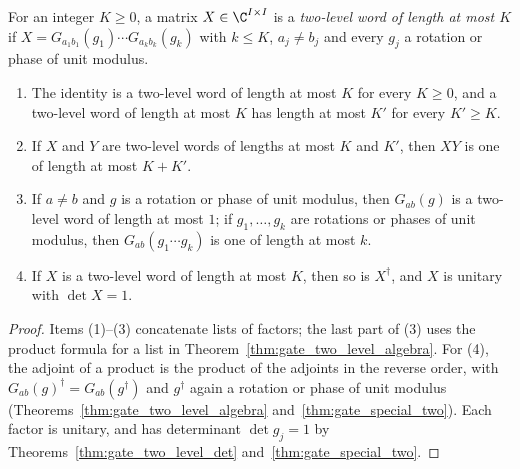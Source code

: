 \begin{definition}
    \label{def:gate_two_level_word}
    \leanok
    For an integer $K\geq0$, a matrix $X\in\C^{I\times I}$ is a
    \emph{two-level word of length at most $K$} if
    $X=G_{a_1b_1}(g_1)\cdots G_{a_kb_k}(g_k)$ with $k\leq K$, $a_j\neq b_j$
    and every $g_j$ a rotation or phase of unit modulus.
\end{definition}

\begin{theorem}
    \label{thm:gate_two_level_word_closure}
    \leanok
    \begin{enumerate}
        \item The identity is a two-level word of length at most $K$ for
              every $K\geq0$, and a two-level word of length at most $K$ has
              length at most $K'$ for every $K'\geq K$.
        \item If $X$ and $Y$ are two-level words of lengths at most $K$ and
              $K'$, then $XY$ is one of length at most $K+K'$.
        \item If $a\neq b$ and $g$ is a rotation or phase of unit modulus,
              then $G_{ab}(g)$ is a two-level word of length at most $1$; if
              $g_1,\ldots,g_k$ are rotations or phases of unit modulus, then
              $G_{ab}(g_1\cdots g_k)$ is one of length at most $k$.
        \item If $X$ is a two-level word of length at most $K$, then so is
              $X^\dagger$, and $X$ is unitary with $\det X=1$.
    \end{enumerate}
\end{theorem}
\begin{proof}\leanok
    Items (1)--(3) concatenate lists of factors; the last part of (3) uses
    the product formula for a list in
    Theorem~\ref{thm:gate_two_level_algebra}. For (4), the adjoint of a
    product is the product of the adjoints in the reverse order, with
    $G_{ab}(g)^\dagger=G_{ab}(g^\dagger)$ and $g^\dagger$ again a rotation or
    phase of unit modulus (Theorems~\ref{thm:gate_two_level_algebra}
    and~\ref{thm:gate_special_two}). Each factor is unitary, and has
    determinant $\det g_j=1$ by Theorems~\ref{thm:gate_two_level_det}
    and~\ref{thm:gate_special_two}.
\end{proof}

